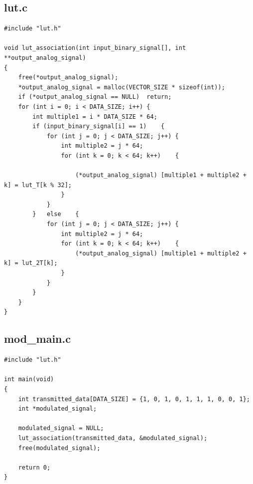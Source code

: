 \documentclass[11pt,a4paper]{report}
\begin{document}
	\subsection{lut.c}
		\begin{verbatim}
#include "lut.h"
		
void lut_association(int input_binary_signal[], int **output_analog_signal)
{
	free(*output_analog_signal);
	*output_analog_signal = malloc(VECTOR_SIZE * sizeof(int));
	if (*output_analog_signal == NULL)	return;
	for (int i = 0; i < DATA_SIZE; i++)	{
		int multiple1 = i * DATA_SIZE * 64;
		if (input_binary_signal[i] == 1)	{
			for (int j = 0; j < DATA_SIZE; j++)	{
				int multiple2 = j * 64;
				for (int k = 0; k < 64; k++)	{
							
					(*output_analog_signal) [multiple1 + multiple2 + k] = lut_T[k % 32];
				}
			}
		}	else	{
			for (int j = 0; j < DATA_SIZE; j++)	{
				int multiple2 = j * 64;
				for (int k = 0; k < 64; k++)	{
					(*output_analog_signal) [multiple1 + multiple2 + k] = lut_2T[k];
				}
			}
		}
	}
}
		\end{verbatim}
		
	\subsection{mod\_main.c}
		\begin{verbatim}
#include "lut.h"
	
int main(void)
{
	int transmitted_data[DATA_SIZE] = {1, 0, 1, 0, 1, 1, 1, 0, 0, 1};
	int *modulated_signal;
		
	modulated_signal = NULL;
	lut_association(transmitted_data, &modulated_signal);
	free(modulated_signal);
		
	return 0;
}
		
		\end{verbatim}
		
\end{document}

